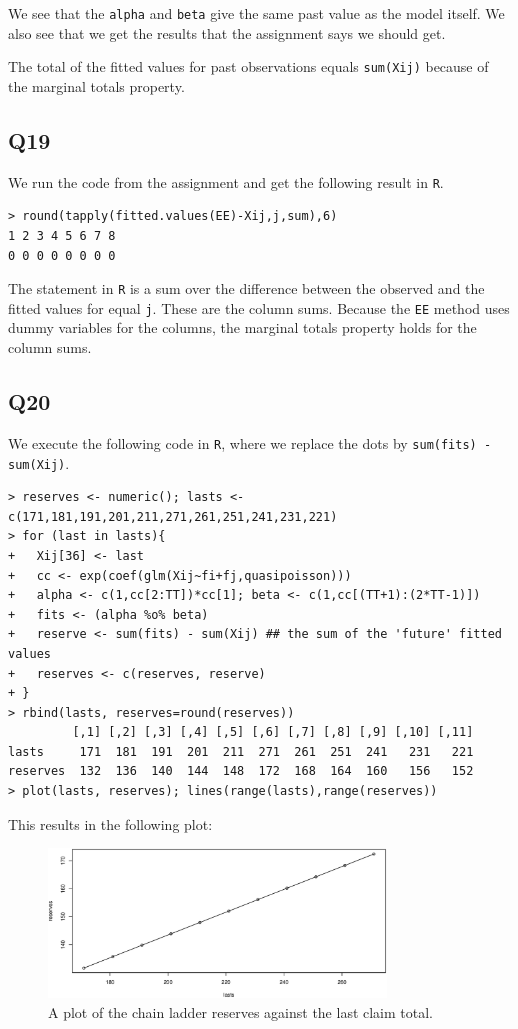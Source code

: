 \documentclass[11pt]{article}
\begin{document}
We see that the \verb|alpha| and \verb|beta| give the same past value as the model itself. We also see that we get the results that the assignment says we should get.

The total of the fitted values for past observations equals \verb|sum(Xij)| because of the marginal totals property.

\subsection*{Q19}

We run the code from the assignment and get the following result in \verb|R|.

\begin{verbatim}
> round(tapply(fitted.values(EE)-Xij,j,sum),6)
1 2 3 4 5 6 7 8 
0 0 0 0 0 0 0 0 
\end{verbatim}

The statement in \verb|R| is a sum over the difference between the observed and the fitted values for equal \verb|j|. These are the column sums. Because the \verb|EE| method uses dummy variables for the columns, the marginal totals property holds for the column sums.

\subsection*{Q20}

We execute the following code in \verb|R|, where we replace the dots by \verb|sum(fits) - sum(Xij)|.

\begin{verbatim}
> reserves <- numeric(); lasts <- c(171,181,191,201,211,271,261,251,241,231,221)
> for (last in lasts){
+   Xij[36] <- last
+   cc <- exp(coef(glm(Xij~fi+fj,quasipoisson)))
+   alpha <- c(1,cc[2:TT])*cc[1]; beta <- c(1,cc[(TT+1):(2*TT-1)])
+   fits <- (alpha %o% beta)
+   reserve <- sum(fits) - sum(Xij) ## the sum of the 'future' fitted values
+   reserves <- c(reserves, reserve) 
+ }
> rbind(lasts, reserves=round(reserves))
         [,1] [,2] [,3] [,4] [,5] [,6] [,7] [,8] [,9] [,10] [,11]
lasts     171  181  191  201  211  271  261  251  241   231   221
reserves  132  136  140  144  148  172  168  164  160   156   152
> plot(lasts, reserves); lines(range(lasts),range(reserves))
\end{verbatim}

This results in the following plot:

\begin{figure}[H]\label{fig:q20}
	\centering
	\includegraphics[width=0.8\textwidth]{fig_q20.eps}
	\caption{A plot of the chain ladder reserves against the last claim total.}
\end{figure}
\end{document}
